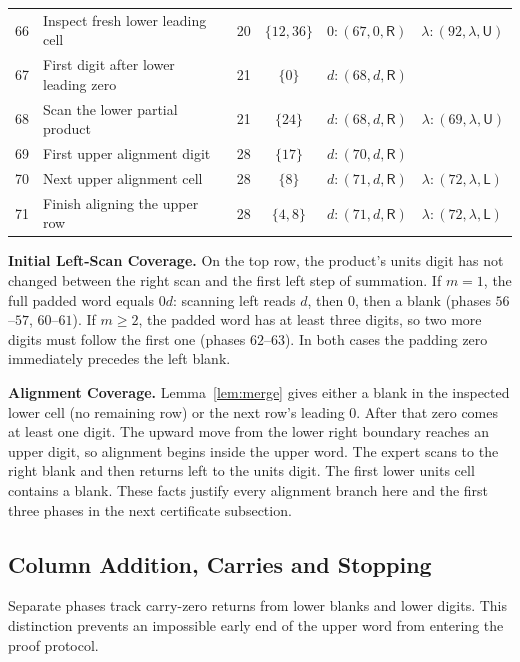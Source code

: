 \documentclass[11pt,a4paper]{article}
\newcommand{\blank}{\lambda}
\newcommand{\triple}[3]{(#1,#2,\mathsf{#3})}
\begin{document}
\begin{center}
\begin{tabularx}{\textwidth}{r p{5.5cm} c c X}
66 & Inspect fresh lower leading cell & 20 & $\{12,36\}$ & $0:\triple{67}{0}{R}\quad \blank:\triple{92}{\blank}{U}$ \\
67 & First digit after lower leading zero & 21 & $\{0\}$ & $d:\triple{68}{d}{R}$ \\
68 & Scan the lower partial product & 21 & $\{24\}$ & $d:\triple{68}{d}{R}\quad \blank:\triple{69}{\blank}{U}$ \\
69 & First upper alignment digit & 28 & $\{17\}$ & $d:\triple{70}{d}{R}$ \\
70 & Next upper alignment cell & 28 & $\{8\}$ & $d:\triple{71}{d}{R}\quad \blank:\triple{72}{\blank}{L}$ \\
71 & Finish aligning the upper row & 28 & $\{4,8\}$ & $d:\triple{71}{d}{R}\quad \blank:\triple{72}{\blank}{L}$ \\
\bottomrule
\end{tabularx}
\end{center}

\textbf{Initial Left-Scan Coverage.}
On the top row, the product's units digit has not changed between the right scan and the first left step of summation. If $m=1$, the full padded word equals $0d$: scanning left reads $d$, then $0$, then a blank (phases
$56$--$57$, $60$--$61$). If $m\ge2$, the padded word has at least three digits,
so two more digits must follow the first one (phases $62$--$63$).
In both cases the padding zero immediately precedes the left blank.

\textbf{Alignment Coverage.}
Lemma~\ref{lem:merge} gives either a blank in the inspected lower cell
(no remaining row) or the next row's leading $0$. After that zero comes
at least one digit. The upward move from the lower right boundary reaches
an upper digit, so alignment begins inside the upper word. The expert scans to the right blank and then returns left to the units digit. The first lower units cell contains a blank. These facts justify every alignment branch here and
the first three phases in the next certificate subsection.

\newpage
\subsection{Column Addition, Carries and Stopping}\label{sec:part6}
Separate phases track carry-zero returns from lower blanks and lower digits. This distinction prevents an
impossible early end of the upper word from entering the proof protocol.
\end{document}
